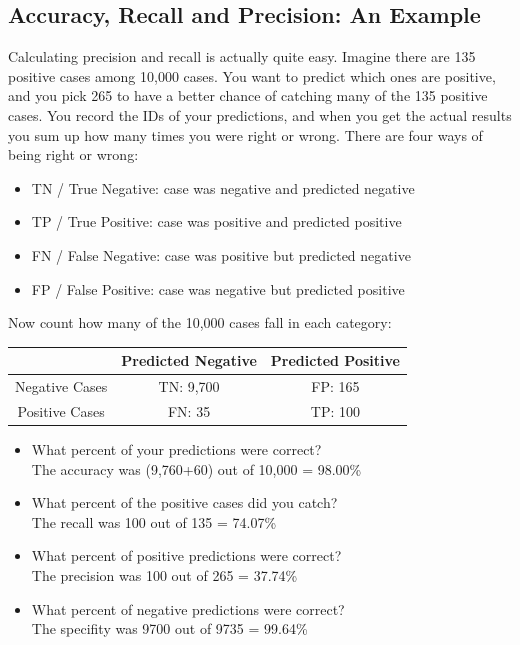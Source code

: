 \documentclass[]{report}
\begin{document}
\subsection*{Accuracy, Recall and Precision: An Example}
Calculating precision and recall is actually quite easy. Imagine there are
135 positive cases among 10,000 cases. You want to predict which ones are
positive, and you pick 265 to have a better chance of catching many of the
135 positive cases. You record the IDs of your predictions, and when you
get the actual results you sum up how many times you were right or wrong.
There are four ways of being right or wrong:
\begin{itemize}
	\item TN / True Negative: case was negative and predicted negative
	\item TP / True Positive: case was positive and predicted positive
	\item  FN / False Negative: case was positive but predicted negative
	\item FP / False Positive: case was negative but predicted positive
\end{itemize}
Now count how many of the 10,000 cases fall in each category:
\begin{center}
	\begin{tabular}{|c|c|c|} \hline
		& Predicted Negative & Predicted Positive \\ \hline
		Negative Cases & TN: 9,700 & FP: 165 \\ \hline
		Positive Cases &  FN: 35 & TP: 100 \\ \hline
	\end{tabular}
\end{center}

\begin{itemize}
	\item What percent of your predictions were correct? \\The accuracy was (9,760+60) out of 10,000 = 98.00\%
	\item	What percent of the positive cases did you catch?\\
	The recall was 100 out of 135 = 74.07\%
	\item	What percent of positive predictions were correct?\\
	The precision was 100 out of 265 = 37.74\%
	\item 	What percent of negative predictions were correct?\\
	The specifity was 9700 out of 9735 = 99.64\%
\end{itemize}
\end{document}

